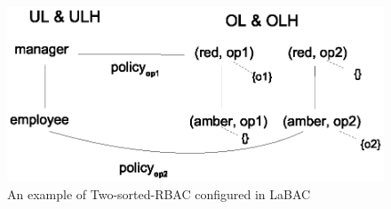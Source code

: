  \begin{figure}
 	\centering
 	\includegraphics[width=.7\textwidth]{ABAC16/two-sorted-rbac-to-labac-example}
 	\caption{An example of Two-sorted-RBAC configured in LaBAC}
 	\label{fig:two-sorted-rbac-to-labac-example}
 \end{figure}
 

